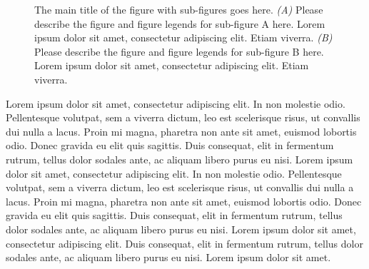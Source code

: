 \begin{figure}[tbh]
\centering
{}
\hfill
{}
\caption[The main title of the figure with sub-figures goes here. It is a long title which goes to the next line.]{The main title of the figure with sub-figures goes here. \textit{(A)} Please describe the figure and figure legends for sub-figure A here. Lorem ipsum dolor sit amet, consectetur adipiscing elit. Etiam viverra. \textit{(B)} Please describe the figure and figure legends for sub-figure B here. Lorem ipsum dolor sit amet, consectetur adipiscing elit. Etiam viverra.}
\label{fig:main_figure}
\end{figure}

Lorem ipsum dolor sit amet, consectetur adipiscing elit. In non molestie odio. Pellentesque volutpat, sem a viverra dictum, leo est scelerisque risus, ut convallis dui nulla a lacus. Proin mi magna, pharetra non ante sit amet, euismod lobortis odio. Donec gravida eu elit quis sagittis. Duis consequat, elit in fermentum rutrum, tellus dolor sodales ante, ac aliquam libero purus eu nisi. Lorem ipsum dolor sit amet, consectetur adipiscing elit. In non molestie odio. Pellentesque volutpat, sem a viverra dictum, leo est scelerisque risus, ut convallis dui nulla a lacus. Proin mi magna, pharetra non ante sit amet, euismod lobortis odio. Donec gravida eu elit quis sagittis. Duis consequat, elit in fermentum rutrum, tellus dolor sodales ante, ac aliquam libero purus eu nisi. Lorem ipsum dolor sit amet, consectetur adipiscing elit. Duis consequat, elit in fermentum rutrum, tellus dolor sodales ante, ac aliquam libero purus eu nisi. Lorem ipsum dolor sit amet. 
    
